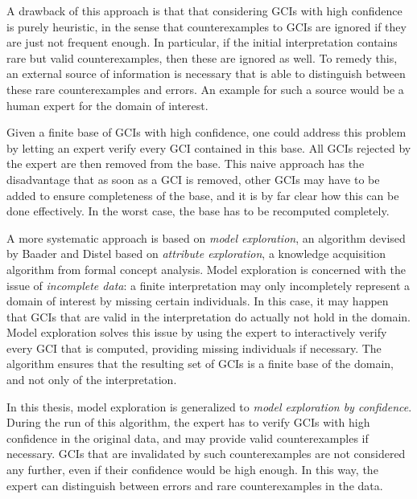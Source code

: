 \documentclass[english,fleqn]{scrartcl}
\begin{document}
A drawback of this approach is that that considering GCIs with high confidence is purely
heuristic, in the sense that counterexamples to GCIs are ignored if they are just not
frequent enough.  In particular, if the initial interpretation contains rare but valid
counterexamples, then these are ignored as well.  To remedy this, an external source of
information is necessary that is able to distinguish between these rare counterexamples
and errors.  An example for such a source would be a human expert for the domain of
interest.

Given a finite base of GCIs with high confidence, one could address this problem by
letting an expert verify every GCI contained in this base.  All GCIs rejected by the
expert are then removed from the base.  This naive approach has the disadvantage that as
soon as a GCI is removed, other GCIs may have to be added to ensure completeness of the
base, and it is by far clear how this can be done effectively.  In the worst case, the
base has to be recomputed completely.

A more systematic approach is based on \emph{model exploration}, an algorithm devised by
Baader and Distel based on \emph{attribute exploration}, a knowledge acquisition algorithm
from formal concept analysis.  Model exploration is concerned with the issue of
\emph{incomplete data}: a finite interpretation may only incompletely represent a domain
of interest by missing certain individuals.  In this case, it may happen that GCIs that
are valid in the interpretation do actually not hold in the domain.  Model exploration
solves this issue by using the expert to interactively verify every GCI that is computed,
providing missing individuals if necessary.  The algorithm ensures that the resulting set
of GCIs is a finite base of the domain, and not only of the interpretation.

In this thesis, model exploration is generalized to \emph{model exploration by
  confidence}.  During the run of this algorithm, the expert has to verify GCIs with high
confidence in the original data, and may provide valid counterexamples if necessary.  GCIs
that are invalidated by such counterexamples are not considered any further, even if their
confidence would be high enough.  In this way, the expert can distinguish between errors
and rare counterexamples in the data.

\printbibliography{}
\end{document}
